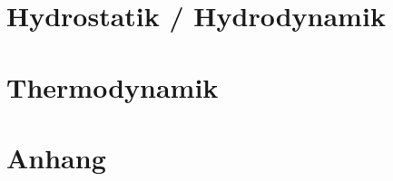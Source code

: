 \documentclass[8pt, a4paper, twoside]{extarticle}
\begin{document}
    \begin{layout}
		\part{Hydrostatik / Hydrodynamik}
        
		
		

		\part{Thermodynamik}
		
		
		
		
		
		
		
		
		
		\part{Anhang}
		
    \end{layout}
\end{document}
